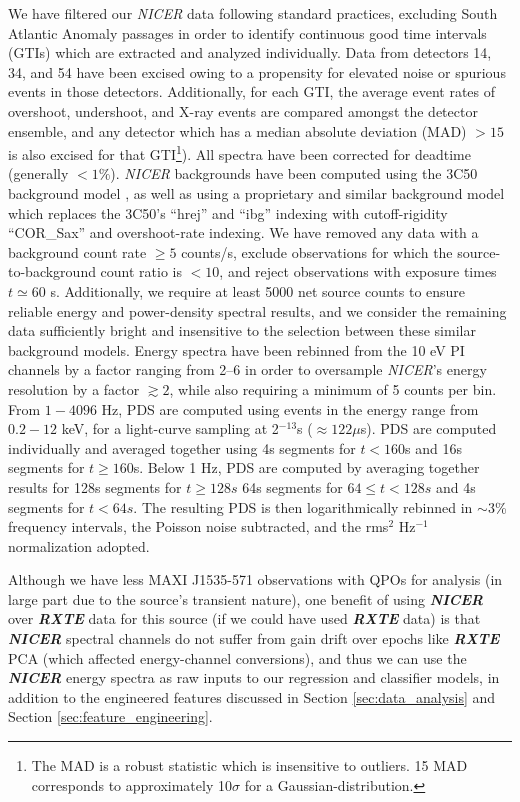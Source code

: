 \documentclass[fleqn,usenatbib,twocolumn]{mnras}%
\begin{document}
We have filtered our \textit{NICER} data following standard practices, excluding South Atlantic Anomaly passages in order to identify continuous good time intervals (GTIs) which are extracted and analyzed individually.  Data from detectors 14, 34, and 54 have been excised owing to a propensity for elevated noise or spurious events in those detectors.  Additionally, for each GTI, the average event rates of overshoot, undershoot, and X-ray events are compared amongst the detector ensemble, and any detector which has a median absolute deviation (MAD) $>15$ is also excised for that GTI\footnote{The MAD is a robust statistic which is insensitive to outliers. 15 MAD corresponds to approximately 10$\sigma$ for a Gaussian-distribution.}).  All spectra have been corrected for deadtime (generally $<1\%$). {\em NICER} backgrounds have been computed using the 3C50 background model \citep{Remillard_3C50}, as well as using a proprietary and similar background model which replaces the 3C50's ``hrej'' and ``ibg'' indexing with cutoff-rigidity ``COR\_Sax'' and overshoot-rate indexing. We have removed any data with a background count rate $\geq5$ counts/s, exclude observations for which the source-to-background count ratio is $<10$, and reject observations with exposure times $t\simeq60$ s. Additionally, we require at least 5000 net source counts to ensure reliable energy and power-density spectral results, and we consider the remaining data sufficiently bright and insensitive to the selection between these similar background models. Energy spectra have been rebinned from the 10 eV PI channels by a factor ranging from 2--6 in order to oversample {\em NICER}'s energy resolution by a factor $\gtrsim 2$, while also requiring a minimum of 5 counts per bin. From $1-4096$ Hz, PDS are computed using events in the energy range from $0.2-12$ keV, for a light-curve sampling at 2$^{-13}$s ($\approx 122\mu$s). PDS are computed individually and averaged together using 4s segments for $t<160$s and 16s segments for $t\geq160$s. Below 1 Hz, PDS are computed by averaging together results for 128s segments for $t\geq 128s$ 64s segments for $64\leq t<128s$ and 4s segments for $t<64s$.  The resulting PDS is then logarithmically rebinned in  $\sim3$\% frequency intervals, the Poisson noise subtracted, and the rms$^2$ Hz$^{-1}$ normalization adopted.

Although we have less MAXI J1535-571 observations with QPOs for analysis (in large part due to the source's transient nature), one benefit of using \textbf{\textit{NICER}} over \textbf{\textit{RXTE}} data for this source (if we could have used \textbf{\textit{RXTE}} data) is that \textbf{\textit{NICER}} spectral channels do not suffer from gain drift over epochs like \textbf{\textit{RXTE}} PCA (which affected energy-channel conversions), and thus we can use the \textbf{\textit{NICER}} energy spectra as raw inputs to our regression and classifier models, in addition to the engineered features discussed in Section \ref{sec:data_analysis} and Section \ref{sec:feature_engineering}.
\end{document}
